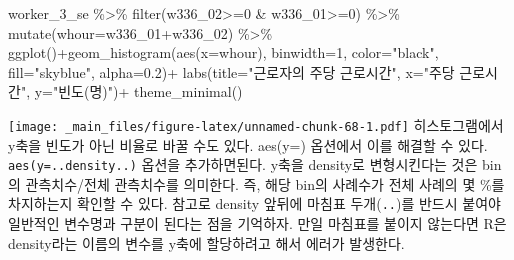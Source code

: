 \documentclass[
]{book}
\newenvironment{Shaded}{\begin{snugshade}}{\end{snugshade}}
\newcommand{\AttributeTok}[1]{\textcolor[rgb]{0.77,0.63,0.00}{#1}}
\newcommand{\DecValTok}[1]{\textcolor[rgb]{0.00,0.00,0.81}{#1}}
\newcommand{\FloatTok}[1]{\textcolor[rgb]{0.00,0.00,0.81}{#1}}
\newcommand{\FunctionTok}[1]{\textcolor[rgb]{0.00,0.00,0.00}{#1}}
\newcommand{\NormalTok}[1]{#1}
\newcommand{\SpecialCharTok}[1]{\textcolor[rgb]{0.00,0.00,0.00}{#1}}
\newcommand{\StringTok}[1]{\textcolor[rgb]{0.31,0.60,0.02}{#1}}
\theoremstyle{definition}
\theoremstyle{definition}
\theoremstyle{definition}
\theoremstyle{definition}
\theoremstyle{remark}
\begin{document}
\begin{Shaded}
\begin{Highlighting}[]
\NormalTok{worker\_3\_se }\SpecialCharTok{\%\textgreater{}\%} 
  \FunctionTok{filter}\NormalTok{(w336\_02}\SpecialCharTok{\textgreater{}=}\DecValTok{0} \SpecialCharTok{\&}\NormalTok{ w336\_01}\SpecialCharTok{\textgreater{}=}\DecValTok{0}\NormalTok{) }\SpecialCharTok{\%\textgreater{}\%} 
  \FunctionTok{mutate}\NormalTok{(}\AttributeTok{whour=}\NormalTok{w336\_01}\SpecialCharTok{+}\NormalTok{w336\_02) }\SpecialCharTok{\%\textgreater{}\%} 
  \FunctionTok{ggplot}\NormalTok{()}\SpecialCharTok{+}\FunctionTok{geom\_histogram}\NormalTok{(}\FunctionTok{aes}\NormalTok{(}\AttributeTok{x=}\NormalTok{whour), }\AttributeTok{binwidth=}\DecValTok{1}\NormalTok{, }\AttributeTok{color=}\StringTok{"black"}\NormalTok{, }\AttributeTok{fill=}\StringTok{"skyblue"}\NormalTok{, }\AttributeTok{alpha=}\FloatTok{0.2}\NormalTok{)}\SpecialCharTok{+}
  \FunctionTok{labs}\NormalTok{(}\AttributeTok{title=}\StringTok{"근로자의 주당 근로시간"}\NormalTok{, }\AttributeTok{x=}\StringTok{"주당 근로시간"}\NormalTok{, }\AttributeTok{y=}\StringTok{"빈도(명)"}\NormalTok{)}\SpecialCharTok{+}
  \FunctionTok{theme\_minimal}\NormalTok{()}
\end{Highlighting}
\end{Shaded}

\texttt{[image: \_main\_files/figure-latex/unnamed-chunk-68-1.pdf]}
히스토그램에서 y축을 빈도가 아닌 비율로 바꿀 수도 있다. aes(y=) 옵션에서 이를 해결할 수 있다. \texttt{aes(y=..density..)} 옵션을 추가하면된다. y축을 density로 변형시킨다는 것은 bin의 관측치수/전체 관측치수를 의미한다. 즉, 해당 bin의 사례수가 전체 사례의 몇 \%를 차지하는지 확인할 수 있다. 참고로 density 앞뒤에 마침표 두개(\texttt{..})를 반드시 붙여야 일반적인 변수명과 구분이 된다는 점을 기억하자. 만일 마침표를 붙이지 않는다면 R은 density라는 이름의 변수를 y축에 할당하려고 해서 에러가 발생한다.
\end{document}
